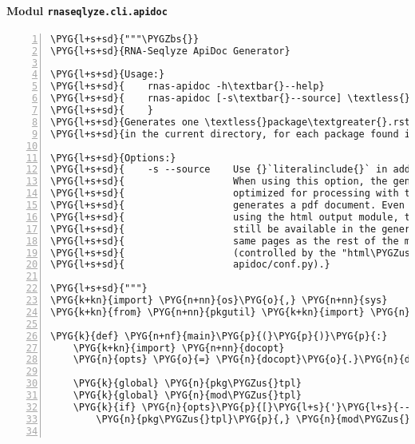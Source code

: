\paragraph{Modul \texttt{rnaseqlyze.cli.apidoc}}
\label{rnaseqlyze-pdf:modul-rnaseqlyze-cli-apidoc}
\begin{Verbatim}[commandchars=\\\{\},numbers=left,firstnumber=1,stepnumber=5]
\PYG{l+s+sd}{"""\PYGZbs{}}
\PYG{l+s+sd}{RNA-Seqlyze ApiDoc Generator}

\PYG{l+s+sd}{Usage:}
\PYG{l+s+sd}{    rnas-apidoc -h\textbar{}--help}
\PYG{l+s+sd}{    rnas-apidoc [-s\textbar{}--source] \textless{}path\textgreater{} ...}
\PYG{l+s+sd}{    }
\PYG{l+s+sd}{Generates one \textless{}package\textgreater{}.rst sphinx apidoc source file,}
\PYG{l+s+sd}{in the current directory, for each package found in \textless{}path\textgreater{}.}

\PYG{l+s+sd}{Options:}
\PYG{l+s+sd}{    -s --source    Use {}`literalinclude{}` in addition to {}`automodule{}`.}
\PYG{l+s+sd}{                   When using this option, the generated output will be}
\PYG{l+s+sd}{                   optimized for processing with the spinx latexpdf module that}
\PYG{l+s+sd}{                   generates a pdf document. Even without this option, when}
\PYG{l+s+sd}{                   using the html output module, the modules source code will}
\PYG{l+s+sd}{                   still be available in the generated Website, but not on the}
\PYG{l+s+sd}{                   same pages as the rest of the modules documentation}
\PYG{l+s+sd}{                   (controlled by the "html\PYGZus{}show\PYGZus{}sourcelink" option in}
\PYG{l+s+sd}{                   apidoc/conf.py).}

\PYG{l+s+sd}{"""}
\PYG{k+kn}{import} \PYG{n+nn}{os}\PYG{o}{,} \PYG{n+nn}{sys}
\PYG{k+kn}{from} \PYG{n+nn}{pkgutil} \PYG{k+kn}{import} \PYG{n}{walk\PYGZus{}packages}

\PYG{k}{def} \PYG{n+nf}{main}\PYG{p}{(}\PYG{p}{)}\PYG{p}{:}
    \PYG{k+kn}{import} \PYG{n+nn}{docopt}
    \PYG{n}{opts} \PYG{o}{=} \PYG{n}{docopt}\PYG{o}{.}\PYG{n}{docopt}\PYG{p}{(}\PYG{n}{\PYGZus{}\PYGZus{}doc\PYGZus{}\PYGZus{}}\PYG{p}{)}

    \PYG{k}{global} \PYG{n}{pkg\PYGZus{}tpl}
    \PYG{k}{global} \PYG{n}{mod\PYGZus{}tpl}
    \PYG{k}{if} \PYG{n}{opts}\PYG{p}{[}\PYG{l+s}{'}\PYG{l+s}{--source}\PYG{l+s}{'}\PYG{p}{]}\PYG{p}{:}
        \PYG{n}{pkg\PYGZus{}tpl}\PYG{p}{,} \PYG{n}{mod\PYGZus{}tpl} \PYG{o}{=} \PYG{n}{pkg\PYGZus{}src\PYGZus{}tpl}\PYG{p}{,} \PYG{n}{mod\PYGZus{}src\PYGZus{}tpl}


\end{Verbatim}
